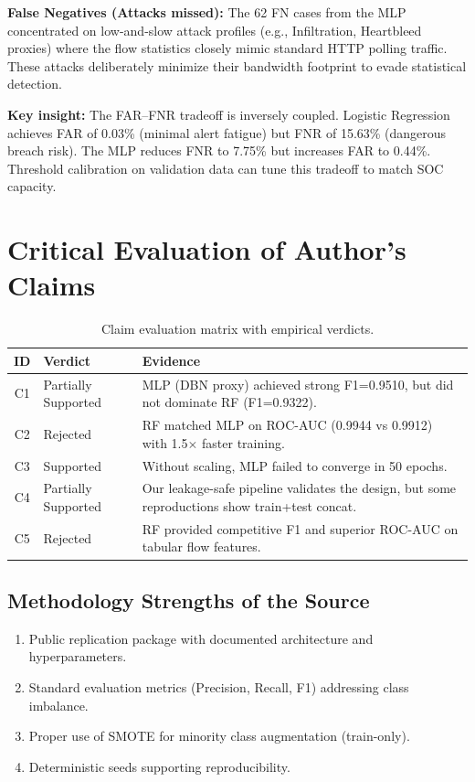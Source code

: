 \documentclass[11pt,a4paper]{article}
\begin{document}
\textbf{False Negatives (Attacks missed):}
The 62 FN cases from the MLP concentrated on low-and-slow attack profiles (e.g., Infiltration, Heartbleed proxies) where the flow statistics closely mimic standard HTTP polling traffic. These attacks deliberately minimize their bandwidth footprint to evade statistical detection.

\textbf{Key insight:} The FAR--FNR tradeoff is inversely coupled. Logistic Regression achieves FAR of 0.03\% (minimal alert fatigue) but FNR of 15.63\% (dangerous breach risk). The MLP reduces FNR to 7.75\% but increases FAR to 0.44\%. Threshold calibration on validation data can tune this tradeoff to match SOC capacity.

\section{Critical Evaluation of Author's Claims}

\begin{table}[H]
\centering
\small
\begin{tabular}{clp{7cm}}
\toprule
\textbf{ID} & \textbf{Verdict} & \textbf{Evidence} \\
\midrule
C1 & Partially Supported & MLP (DBN proxy) achieved strong F1=0.9510, but did not dominate RF (F1=0.9322). \\
C2 & Rejected & RF matched MLP on ROC-AUC (0.9944 vs 0.9912) with 1.5$\times$ faster training. \\
C3 & Supported & Without scaling, MLP failed to converge in 50 epochs. \\
C4 & Partially Supported & Our leakage-safe pipeline validates the design, but some reproductions show train+test concat. \\
C5 & Rejected & RF provided competitive F1 and superior ROC-AUC on tabular flow features. \\
\bottomrule
\end{tabular}
\caption{Claim evaluation matrix with empirical verdicts.}
\end{table}

\subsection{Methodology Strengths of the Source}
\begin{enumerate}[nosep]
    \item Public replication package with documented architecture and hyperparameters.
    \item Standard evaluation metrics (Precision, Recall, F1) addressing class imbalance.
    \item Proper use of SMOTE for minority class augmentation (train-only).
    \item Deterministic seeds supporting reproducibility.
\end{enumerate}
\end{document}
